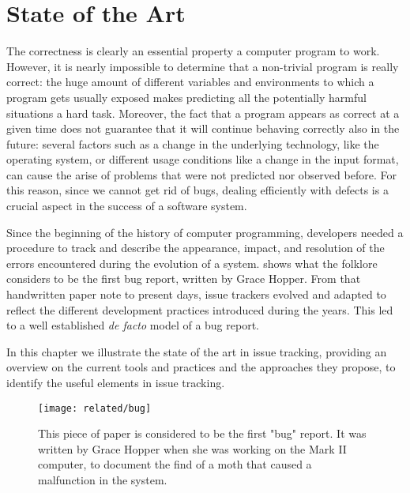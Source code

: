 
\chapter{State of the Art}\label{ch:related}


The correctness is clearly an essential property a computer program to work.
However, it is nearly impossible to determine that a non-trivial program is really correct: the huge amount of different variables and environments to which a program gets usually exposed makes predicting all the potentially harmful situations a hard task.
Moreover, the fact that a program appears as correct at a given time does not guarantee that it will continue behaving correctly also in the future: several factors such as a change in the underlying technology, like the operating system, or different usage conditions like a change in the input format, can cause the arise of problems that were not predicted nor observed before.
For this reason, since we cannot get rid of bugs, dealing efficiently with defects is a crucial aspect in the success of a software system.

Since the beginning of the history of computer programming, developers needed a procedure to track and describe the appearance, impact, and resolution of the errors encountered during the evolution of a system.
 shows what the folklore considers to be the first bug report, written by Grace Hopper.
From that handwritten paper note to present days, issue trackers evolved and adapted to reflect the different development practices introduced during the years.
This led to a well established \emph{de facto} model of a bug report.

In this chapter we illustrate the state of the art in issue tracking, providing an overview on the current tools and practices and the approaches they propose, to identify the useful elements in issue tracking.

\begin{figure}[t]
\centering
  \texttt{[image: related/bug]}
  \caption[The first "bug" report.]{This piece of paper is considered to be the first "bug" report. It was written by Grace Hopper when she was working on the Mark II computer, to document the find of a moth that caused a malfunction in the system.}
  \label{fig:first-bug-report}
\end{figure}


